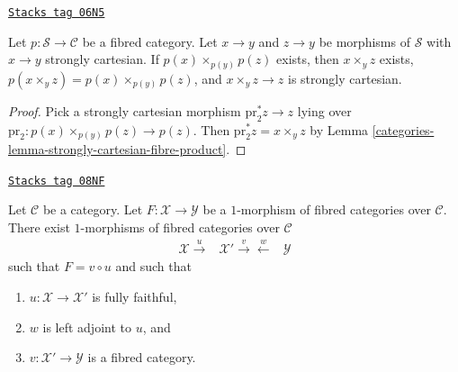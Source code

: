 \begin{lemma}
\label{categories-lemma-fibred-category-representable-goes-up}
\href{https://stacks.math.columbia.edu/tag/06N5}{\texttt{Stacks tag 06N5}}

Let $p : \mathcal{S} \to \mathcal{C}$ be a fibred category.
Let $x \to y$ and $z \to y$ be morphisms of $\mathcal{S}$
with $x \to y$ strongly cartesian. If $p(x) \times_{p(y)} p(z)$ exists,
then $x \times_y z$ exists, $p(x \times_y z) = p(x) \times_{p(y)} p(z)$,
and $x \times_y z \to z$ is strongly cartesian.
\end{lemma}

\begin{proof}

Pick a strongly cartesian morphism
$\text{pr}_2^*z \to z$ lying over
$\text{pr}_2 : p(x) \times_{p(y)} p(z) \to p(z)$. Then
$\text{pr}_2^*z = x \times_y z$ by
Lemma \ref{categories-lemma-strongly-cartesian-fibre-product}.
\end{proof}

\begin{lemma}
\label{categories-lemma-ameliorate-morphism-fibred-categories}
\href{https://stacks.math.columbia.edu/tag/08NF}{\texttt{Stacks tag 08NF}}

Let $\mathcal{C}$ be a category. Let $F : \mathcal{X} \to \mathcal{Y}$
be a $1$-morphism of fibred categories over $\mathcal{C}$.
There exist $1$-morphisms of fibred categories over $\mathcal{C}$
$$
\begin{array}{ccc}\mathcal{X} \overset{u}{\longrightarrow} & \mathcal{X}' \overset{v}{\longrightarrow}\overset{w}{\longleftarrow} & \mathcal{Y}\end{array}
$$
such that $F = v \circ u$ and such that
\begin{enumerate}
\item $u : \mathcal{X} \to \mathcal{X}'$ is fully faithful,
\item $w$ is left adjoint to $u$, and
\item $v : \mathcal{X}' \to \mathcal{Y}$ is a fibred category.
\end{enumerate}
\end{lemma}

